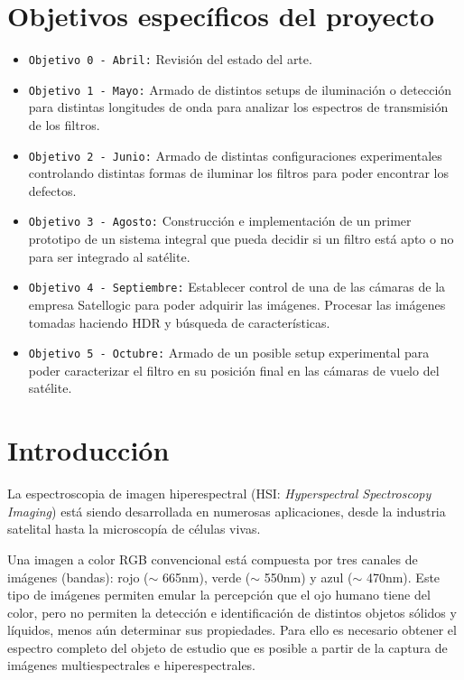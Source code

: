 \documentclass{ctuthesis}
\begin{document}
\section*{Objetivos específicos del proyecto}
\begin{itemize}
	
	\item \texttt{Objetivo 0 - Abril:} Revisión del estado del arte.
	\item \texttt{Objetivo 1 - Mayo:} Armado de distintos setups de iluminación 
	o detección para distintas longitudes de onda para analizar los espectros 
	de transmisión de los filtros.
	\item \texttt{Objetivo 2 - Junio:} Armado de distintas configuraciones 
	experimentales controlando distintas formas de iluminar los filtros
	para poder encontrar los defectos.
	\item \texttt{Objetivo 3 - Agosto:} Construcción e implementación de un primer prototipo de un sistema integral que pueda decidir si un filtro está apto o no para ser integrado al satélite.
	\item \texttt{Objetivo 4 - Septiembre:} Establecer control de una de las cámaras de la empresa Satellogic para poder adquirir las
	imágenes. Procesar las imágenes tomadas haciendo HDR y búsqueda de características.
	\item \texttt{Objetivo 5 - Octubre:} Armado de un posible setup 
	experimental para poder caracterizar el filtro en su posición final
	en las cámaras de vuelo del satélite.
\end{itemize}
\section*{Introducción}

\hspace{0.5cm}La espectroscopia de imagen hiperespectral (HSI: 
\textit{Hyperspectral 
Spectroscopy Imaging}) está siendo desarrollada en numerosas aplicaciones, 
desde la industria satelital hasta la microscopía de células vivas.

Una imagen a color RGB convencional está compuesta por tres canales de 
imágenes (bandas): rojo 
($\sim$ 665nm), verde ($\sim$ 550nm) y azul ($\sim$ 470nm). Este tipo de 
imágenes permiten emular la percepción que el ojo humano tiene del color, pero 
no permiten la detección e identificación de distintos objetos sólidos y 
líquidos, menos 
aún determinar sus propiedades. Para ello 
es necesario obtener el espectro completo del objeto de estudio que es posible 
a partir de la captura de imágenes multiespectrales e hiperespectrales.
\end{document}
